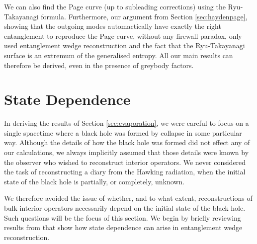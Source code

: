 \documentclass[12pt]{article}
\begin{document}
We can also find the Page curve (up to subleading corrections) using the Ryu-Takayanagi formula. Furthermore, our argument from Section \ref{sec:haydenpage}, showing that the outgoing modes automactically have exactly the right entanglement to reproduce the Page curve, without any firewall paradox, only used entanglement wedge reconstruction and the fact that the Ryu-Takayanagi surface is an extremum of the generalised entropy. All our main results can therefore be derived, even in the presence of greybody factors. 

\section{State Dependence} \label{sec:statedependence}
In deriving the results of Section \ref{sec:evaporation}, we were careful to focus on a single spacetime where a black hole was formed by collapse in some particular way. Although the details of how the black hole was formed did not effect any of our calculations, we always implicitly assumed that those details were known by the observer who wished to reconstruct interior operators. We never considered the task of reconstructing a diary from the Hawking radiation, when the initial state of the black hole is partially, or completely, unknown. 

We therefore avoided the issue of whether, and to what extent, reconstructions of bulk interior operators necessarily depend on the initial state of the black hole. Such questions will be the focus of this section. We begin by briefly reviewing results from \cite{hayden2018learning} that show how state dependence can arise in entanglement wedge reconstruction.
\end{document}

